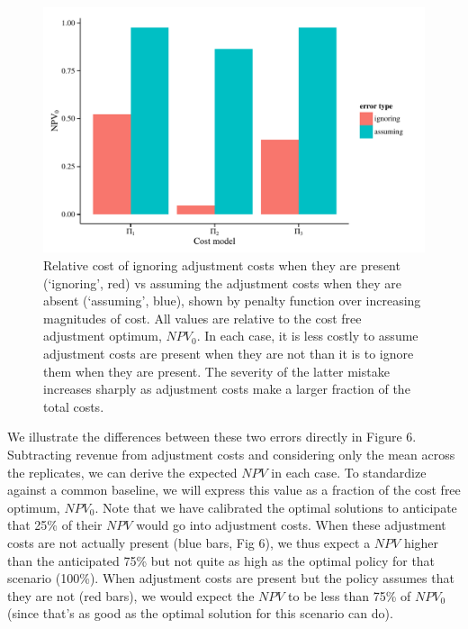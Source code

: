 \documentclass[review,12pt,author-year,titlepage]{components/elsarticle} %
\makeatletter
\def\maxwidth{\ifdim\Gin@nat@width>\linewidth\linewidth
\else\Gin@nat@width\fi}
\let\Oldincludegraphics\includegraphics
\renewcommand{\includegraphics}[1]{\Oldincludegraphics[width=\maxwidth]{#1}}
\makeatother
\begin{document}
\begin{flushleft}
\begin{figure}[htbp]
\centering
\includegraphics{components/figure/manuscript-Figure_6-1.pdf}
\caption{Relative cost of ignoring adjustment costs when they are
present (`ignoring', red) vs assuming the adjustment costs when they are
absent (`assuming', blue), shown by penalty function over increasing
magnitudes of cost. All values are relative to the cost free adjustment
optimum, \(NPV_0\). In each case, it is less costly to assume adjustment
costs are present when they are not than it is to ignore them when they
are present. The severity of the latter mistake increases sharply as
adjustment costs make a larger fraction of the total costs.}
\end{figure}

We illustrate the differences between these two errors directly in
Figure 6. Subtracting revenue from adjustment costs and considering only
the mean across the replicates, we can derive the expected \(NPV\) in
each case. To standardize against a common baseline, we will express
this value as a fraction of the cost free optimum, \(NPV_0\). Note that
we have calibrated the optimal solutions to anticipate that 25\% of
their \(NPV\) would go into adjustment costs. When these adjustment
costs are not actually present (blue bars, Fig 6), we thus expect a
\(NPV\) higher than the anticipated 75\% but not quite as high as the
optimal policy for that scenario (100\%). When adjustment costs are
present but the policy assumes that they are not (red bars), we would
expect the \(NPV\) to be less than 75\% of \(NPV_0\) (since that's as
good as the optimal solution for this scenario can do).


\end{flushleft}
\end{document}
